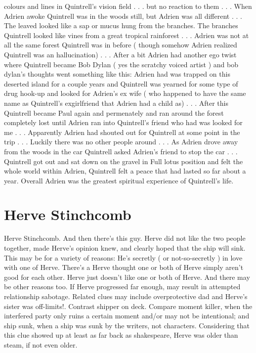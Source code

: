 \documentclass[12pt]{book}
\begin{document}
colours and lines in Quintrell's vision field . . .  but no reaction to them . . .  When Adrien awoke Quintrell was in the woods still, but Adrien was all different . . .  The leaved looked like a sap or mucus hung from the branches. The branches Quintrell looked like vines from a great tropical rainforest . . .  Adrien was not at all the same forest Quintrell was in before ( though somehow Adrien realized Quintrell was an hallucination) . . .  After a bit Adrien had another ego twist where Quintrell became Bob Dylan ( yes the scratchy voiced artist ) and bob dylan's thoughts went something like this: Adrien had was trapped on this deserted island for a couple years and Quintrell was yearned for some type of drug hook-up and looked for Adrien's ex wife ( who happened to have the same name as Quintrell's exgirlfriend that Adrien had a child as) . . .  After this Quintrell became Paul again and permenately and ran around the forest completely lost until Adrien ran into Quintrell's friend who had was looked for me . . .  Apparently Adrien had shouted out for Quintrell at some point in the trip . . .  Luckily there was no other people around . . .  As Adrien drove away from the woods in the car Quintrell asked Adrien's friend to stop the car . . .  Quintrell got out and sat down on the gravel in Full lotus position and felt the whole world within Adrien, Quintrell felt a peace that had lasted so far about a year. Overall Adrien was the greatest spiritual experience of Quintrell's life.



\chapter{Herve Stinchcomb}

Herve Stinchcomb. And then there's this guy. Herve did not like the two people together, made Herve's opinion knew, and clearly hoped that the ship will sink. This may be for a variety of reasons: He's secretly ( or not-so-secretly ) in love with one of Herve. There's a Herve thought one or both of Herve simply aren't good for each other. Herve just doesn't like one or both of Herve. And there may be other reasons too. If Herve progressed far enough, may result in attempted relationship sabotage. Related clues may include overprotective dad and Herve's sister was off-limits!. Contrast shipper on deck. Compare moment killer, when the interfered party only ruins a certain moment and/or may not be intentional; and ship sunk, when a ship was sunk by the writers, not characters. Considering that this clue showed up at least as far back as shakespeare, Herve was older than steam, if not even older.
\end{document}
